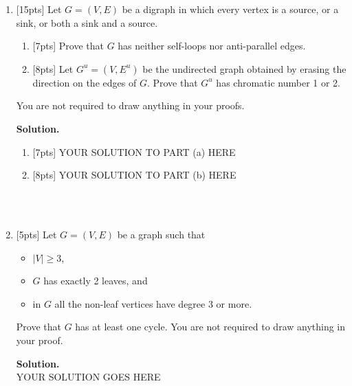 \documentclass[11pt]{article}
\begin{document}
\begin{enumerate}
	~\\~\\
	
	
\item {[15pts]}
Let $G=(V,E)$ be a digraph in which every vertex is a source, or a sink, or both a sink and a source.
\begin{enumerate}
    \item {[7pts]} Prove that $G$ has neither self-loops nor anti-parallel edges.
    \item {[8pts]} Let $G^u=(V,E^u)$ be the undirected graph obtained by erasing the direction on the edges of $G$. Prove that $G^u$ has chromatic number 1 or 2.
\end{enumerate}
You are not required to draw anything in your proofs.
	
	
\textbf{Solution.} \\
\begin{enumerate}
    \item {[7pts]} YOUR SOLUTION TO PART (a) HERE
    \item {[8pts]} YOUR SOLUTION TO PART (b) HERE
\end{enumerate}

	~\\~\\
	
	
\item {[5pts]} Let $G=(V,E)$ be a graph such that
	\begin{itemize}
	    \item $|V|\geq 3$, 
	    \item $G$ has exactly 2 leaves, and
	    \item in $G$ all the non-leaf vertices have degree 3 or more.
	\end{itemize}
	Prove that $G$ has at least one cycle. You are not required to draw anything in your proof.
	
	
\textbf{Solution.} \\
	YOUR SOLUTION GOES HERE
	
	~\\~\\
	
	
\end{enumerate}
\end{document}
